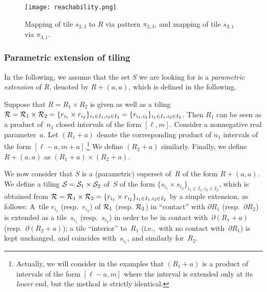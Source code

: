 \begin{figure}[t]
  \centering
 \texttt{[image: reachability.png]}
  \caption{Mapping of tile $s_{2,3}$ to $R$ via pattern $\pi_{2,3}$,
and mapping of tile $s_{3,1}$ via  $\pi_{3,1}$.}
 \label{fig:reachability}
\end{figure}



\subsubsection{Parametric extension of tiling}\label{ss:extension}
In the following, we assume that the set $S$ we are looking for
is a \emph{parametric extension} of $R$, denoted by $R+(a,a)$,
which is defined in the following.

Suppose that $R=R_1\times R_2$ is given
as well as a tiling
${\cal R}={\cal R}_1\times {\cal R}_2=\{r_{i_1}\times r_{i_2}\}_{i_1\in I_1, i_2\in I_2}
=\{r_{i_1,i_2}\}_{i_1\in I_1, i_2\in I_2}$.
Then $R_1$ can be seen as a product of~$n_1$ closed intervals
of the form $[\ell,m]$. Consider a nonnegative real parameter~$a$.
Let $(R_1+a)$ denote the corresponding
product of $n_1$ intervals of the form
$[\ell-a,m+a]$.\footnote{Actually, we will consider in the examples
that $(R_1+a)$ is a product of intervals of
the form $[\ell-a,m]$ where the interval is extended only
at its \emph{lower} end, but the method is strictly identical.}
We define $(R_2+a)$ similarly.
Finally, we define $R+(a,a)$ as $(R_1+a)\times (R_2+a)$.

We now consider that $S$ is a (parametric) superset of~$R$
of the form $R+(a,a)$.
We define a tiling ${\cal S}={\cal S}_1\times{\cal S}_2$
of~$S$ of the form $\{s_{i_1}\times s_{i_2}\}_{i_1\in I_1,i_2\in I_2}$,
which is obtained from
%
${\cal R}={\cal R}_1\times{\cal R}_2=
\{r_{i_1}\times r_{i_2}\}_{i_1\in I_1,i_2\in I_2}$ by a simple extension,
as follows:
%
A~tile $r_{i_1}$ (resp.~$r_{i_2}$) of ${\cal R}_1$ (resp. ${\cal R}_2$)
in ``contact''
with $\partial R_1$ (resp.~$\partial R_2$)
is extended as a tile~$s_{i_1}$ (resp.~$s_{i_2}$)
in order to be in contact with~$\partial (R_1+a)$
(resp.~$\partial (R_2+a)$); 
a tile 
``interior'' to~$R_1$ (i.e.,~with no contact with~$\partial R_1$)
is kept unchanged, and coincides with~$s_{i_1}$,
and similarly for~$R_2$. 

